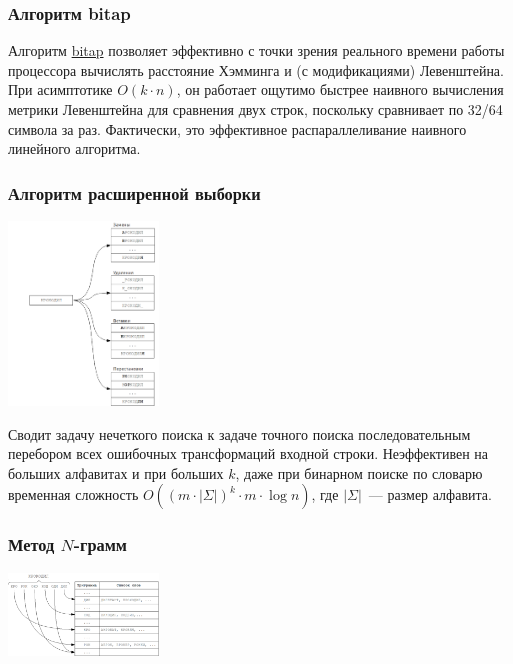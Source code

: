 \subsubsection{Алгоритм bitap}
Алгоритм \href{https://en.wikipedia.org/wiki/Bitap_algorithm}{bitap} позволяет эффективно с точки зрения реального времени работы процессора вычислять расстояние Хэмминга и
(с модификациями) Левенштейна. При асимптотике \(O(k\cdot n)\), он работает ощутимо быстрее наивного вычисления метрики
Левенштейна для сравнения двух строк, поскольку сравнивает по 32/64 символа за раз. Фактически, это эффективное
распараллеливание наивного линейного алгоритма.

\subsubsection{Алгоритм расширенной выборки}
\begin{center}
  \includegraphics[width=0.3\textwidth]{resources/19-26/inflate.png}
\end{center}
Сводит задачу нечеткого поиска к задаче точного поиска последовательным перебором всех ошибочных трансформаций входной строки.
Неэффективен на больших алфавитах и при больших \(k\), даже при бинарном поиске по словарю временная сложность
\(O((m\cdot |\Sigma|)^k\cdot m\cdot \log{n})\), где \(|\Sigma|\)~--- размер алфавита.

\subsubsection{Метод \(N\)-грамм}
\begin{center}
  \includegraphics[width=0.3\textwidth]{resources/19-26/n-gramms.png}
\end{center}

